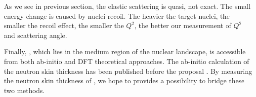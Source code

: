 As we see in previous section, the elastic scattering is quasi, not exact. The
small energy change is caused by nuclei recoil. The heavier the target nuclei,
the smaller the recoil effect, the smaller the $Q^2$, the better our measurement
of $Q^2$ and scattering angle.

Finally, \Ca, which lies in the medium region of the nuclear landscape, is 
accessible from both ab-initio and DFT theoretical approaches. 
The ab-initio calculation of the \Ca neutron skin thickness has been published
before the proposal \cite{Hagen2016}.
By measuring the neutron skin thickness of \Ca, we hope to 
provides a possibility to bridge these two methods. 

\begin{comment}
    \Pb and \Ca are the only 2 stable, neutron rich, closed shell nuclei
    other double magic isotopes: ${}^{10}He$, ${}^{28}O$, ${}^{78}Ni$, ${}^{132}Sn$ 
    are unstable.

    Why \Ca
    \begin{itemize}
	\item neutron rich
	\item doubly magic
	\item can be reached from ab-initio methods
	\item being a smaller system, it allows direct comparison to Chiral EFT 
	    calculations and very sensitive to 3-nucleon forces.
    \end{itemize}
\end{comment}
